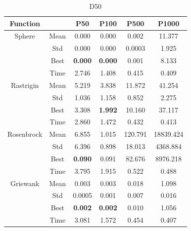 \documentclass[conference]{IEEEtran}
\begin{document}
\begin{table}[h]
	\centering
	\begin{tabular}{|c|c|c|c|c|c|}
		\hline
		\textbf{Function} & & \textbf{P50} & \textbf{P100} & \textbf{P500} & \textbf{P1000} \\
		\hline
		Sphere 			& Mean & 0.000 & 0.000 & 0.002 & 11.377 \\
						& Std & 0.000 & 0.000 & 0.0003 & 1.925 \\
						& Best & \textbf{0.000} & \textbf{0.000} & 0.001 & 8.133 \\
						& Time & 2.746 & 1.408 & 0.415 & 0.409 \\
		\hline
		Rastrigin 		& Mean & 5.219 & 3.838 & 11.872 & 41.254 \\
						& Std & 1.036 & 1.158 & 0.852 & 2.275 \\
						& Best & 3.308 & \textbf{1.992} & 10.160 & 37.117 \\
						& Time & 2.860 & 1.472 & 0.432 & 0.413 \\
		\hline
		Rosenbrock 		& Mean & 6.855 & 1.015 & 120.791 & 18839.424 \\
						& Std & 6.396 & 0.898 & 18.013 & 4368.884 \\
						& Best & \textbf{0.090} & 0.091 & 82.676 & 8976.218 \\
						& Time & 3.795 & 1.915 & 0.522 & 0.488 \\
		\hline
		Griewank 		& Mean & 0.003 & 0.003 & 0.018 & 1.098 \\
						& Std & 0.0005 & 0.001 & 0.007 & 0.016 \\
						& Best & \textbf{0.002} & \textbf{0.002} & 0.010 & 1.056 \\
						& Time & 3.081 & 1.572 & 0.454 & 0.407 \\
		\hline
	\end{tabular}
	\caption{D50}
	\label{tab:benchmark2}
\end{table}
\end{document}
